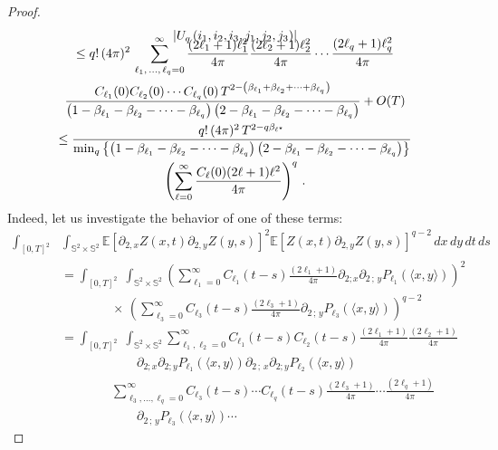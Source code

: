 \documentclass[10pt]{amsart}
\theoremstyle{definition}\newtheorem{defi}[theo]{Definition}\newtheorem{rema}[theo]{Remark}\newtheorem{exam}[theo]{Example}\newtheorem{exem}[theo]{Example}\newtheorem{nota}[theo]{Notation}
\newcommand{\bbS}{\mathbb{S}}
\newcommand{\bbE}{\mathbb{E}}
\begin{document}
\begin{proof}
\begin{multline*}
\vspace*{-10pt}
\left|U_{q}\left(i_{1},i_{2},i_{3},j_{1},j_{2},j_{3}\right)\right|\\
\leq q!\,(4\pi)^{2}\,\sum_{\ell _{1},\,\dots,\,\ell _{q}=0}^{\infty }\frac{(2\ell _{1}+1)\ell _{1}^{2}}{4\pi}\frac{(2\ell _{2}+1)\ell _{2}^{2}}{4\pi}\cdots \frac{(2\ell _{q}+1)\ell _{q}^{2}}{4\pi} \\
\frac{C_{\ell_1}(0)C_{\ell_2}(0)\cdots C_{\ell_q}(0)\,T^{2-\left(\beta_{\ell_1}+\beta_{\ell_2}+\cdots+\beta_{
\ell_q}\right)}}{\left(1-\beta_{\ell_1}-\beta_{\ell_2}-\cdots-\beta_{\ell_q}\right)\left(2-\beta_{\ell_1}-\beta_{\ell_2}-\cdots-\beta_{\ell_q}\right)}+O(T)\\
\leq \frac{q!\,(4\pi)^{2}\,T^{2-q\beta_{\ell ^{\star }}}}
{\min_{q}\left\{\left(1-\beta_{\ell_{1}}-\beta_{\ell _{2}}-\cdots -\beta_{\ell_{q}}\right)\left(2-\beta_{\ell _{1}}-\beta_{\ell_{2}}-\cdots -\beta_{\ell_{q}}\right)\right\}}
\\
\left(\sum_{\ell =0}^{\infty }\frac{C_\ell(0)(2\ell +1)\ell^{2}}{4\pi}\right)^{q}\,.
\end{multline*}
Indeed, let us investigate the behavior of one of these terms:
\begingroup
\allowdisplaybreaks
\begin{align*}
\int_{[0,T]^2}&\int_{\bbS^2 \times \bbS^2}
\bbE\left[\partial_{2,x} Z(x,t)\partial_{2,y} Z(y,s) \right]^2 \bbE\left[Z(x,t)\partial_{2,y} Z(y,s)
\right]^{q-2}\,dx\,dy\,dt\,ds\\
& =\int_{[0,T]^2}\;\int_{\bbS^2 \times \bbS ^2} \left(\sum_{\ell_1=0}^\infty C_{\ell_1}(t-s)\frac{(2\ell_1+1)}{4\pi}
\partial_{2;x}\partial_{2\,;\,y}P_{\ell_1}(\langle x,y \rangle) \right)^2
\,\\
&\qquad\qquad \times\, \left(\sum_{\ell_3=0}^\infty C_{\ell_3}(t-s)\frac{ (2\ell_3+1)}{4\pi}\partial_{2\,;\,y}P_{\ell_3}(\langle x,y \rangle) \right)^{q-2}\\ 
& = \int_{[0,T]^2}\;\int_{\bbS^2 \times \bbS ^2} \sum_{\ell_1,\ell_2=0}^\infty C_{\ell_1}(t-s)C_{\ell_2}(t-s)\frac{(2\ell_1+1)}{4\pi}\frac{(2\ell_2+1)}{4\pi}\\
&\qquad\qquad\qquad \partial_{2;x}\partial_{2;y}P_{\ell_1}(\langle x,y \rangle)\partial_{2\,;\,x}\partial_{2;y}P_{\ell_2}(\langle x,y \rangle) \\
&\qquad\qquad \sum_{\ell_3,\dots,\ell_q=0}^\infty C_{\ell_3}(t-s)\cdots C_{\ell_q}(t-s)\frac{(2\ell_3+1)}{4\pi}\cdots\frac{(2\ell_q+1)}{4\pi}\\
&\qquad\qquad\qquad
\partial_{2\,;\,y}P_{\ell_3}(\langle x,y \rangle) \cdots

\end{align*}
\end{proof}
\end{document}
